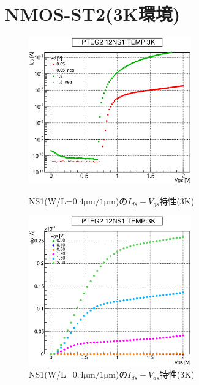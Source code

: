 		\section{NMOS-ST2(3K環境)}
				\begin{figure}[htbp]
					\begin{minipage}{0.5\hsize}
						\begin{center}
							\includegraphics[width=70mm]{./Chapter/Appendix/Picture/NST/NS1/PTEG2_12_NS1_IdVg_3K.eps}
						\end{center}
						\caption{NS1(W/L=$0.4\mathrm{\mu m}/1\mathrm{\mu m}$)の$I_{ds}-V_{gs}$特性(3K)}
						\label{fig:NS1_IdVg_3K}
					\end{minipage}
					\begin{minipage}{0.5\hsize}
						\begin{center}
							\includegraphics[width=70mm]{./Chapter/Appendix/Picture/NST/NS1/PTEG2_12_NS1_IdVd_3K.eps}
						\end{center}
						\caption{NS1(W/L=$0.4\mathrm{\mu m}/1\mathrm{\mu m}$)の$I_{ds}-V_{ds}$特性(3K)}
						\label{fig:NS1_IdVd_3K}
					\end{minipage}
				\end{figure}
